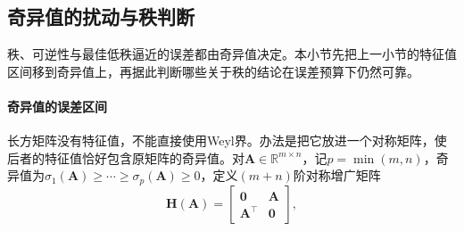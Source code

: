 \subsection{奇异值的扰动与秩判断}
\label{sec:ls-singular-value-sensitivity}

秩、可逆性与最佳低秩逼近的误差都由奇异值决定。本小节先把上一小节的特征值区间移到奇异值上，再据此判断哪些关于秩的结论在误差预算下仍然可靠。

\paragraph{奇异值的误差区间}

长方矩阵没有特征值，不能直接使用Weyl界。办法是把它放进一个对称矩阵，使后者的特征值恰好包含原矩阵的奇异值。对$\bm A\in\mathbb R^{m\times n}$，记$p=\min(m,n)$，奇异值为$\sigma_1(\bm A)\geq\cdots\geq\sigma_p(\bm A)\geq0$，定义$(m+n)$阶对称增广矩阵
\[
 \bm H(\bm A)=\begin{bmatrix}\bm0&\bm A\\\bm A^\top&\bm0\end{bmatrix},
\]

